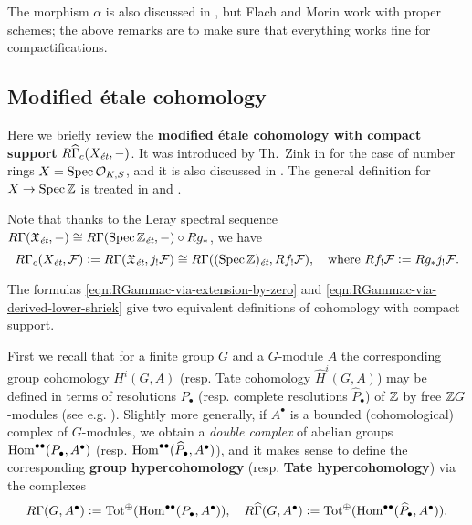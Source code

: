 \documentclass{article}
\numberwithin{equation}{section}
\begin{document}
\begin{appendices}
The morphism $\alpha$ is also discussed in \cite[Appendix~A]{Flach-Morin-2018},
but Flach and Morin work with proper schemes; the above remarks are to make sure
that everything works fine for compactifications.

\subsection*{Modified étale cohomology}

Here we briefly review the
\textbf{modified étale cohomology with compact support}
$R\widehat{\Gamma}_c (X_\et, -)$. It was introduced by Th.~Zink in
\cite[Appendix~2]{Haberland-1978} for the case of number rings
$X = \Spec \mathcal{O}_{K,S}$, and it is also discussed in
\cite[\S II.2]{Milne-ADT}. The general definition for $X \to \Spec\ZZ$
is treated in \cite[\S 6.7]{Flach-Morin-2018} and
\cite[\S 2]{Geisser-Schmidt-2018}.

Note that thanks to the Leray spectral sequence
$R\Gamma (\mathfrak{X}_\et, -) \cong R\Gamma (\Spec \ZZ_\et, -)\circ R g_*$,
we have
\begin{equation}
  \label{eqn:RGammac-via-derived-lower-shriek}
  R\Gamma_c (X_\et, \mathcal{F}) \dfn R\Gamma (\mathfrak{X}_\et, j_!\mathcal{F})
  \cong R\Gamma ((\Spec \ZZ)_\et, R f_! \mathcal{F}), \quad
  \text{where } Rf_! \mathcal{F} \dfn R g_* j_! \mathcal{F}.
\end{equation}

The formulas \eqref{eqn:RGammac-via-extension-by-zero} and
\eqref{eqn:RGammac-via-derived-lower-shriek} give two equivalent definitions of
cohomology with compact support.

First we recall that for a finite group $G$ and a $G$-module $A$ the
corresponding group cohomology $H^i (G,A)$ (resp. Tate cohomology
$\widehat{H}^i (G,A)$) may be defined in terms of resolutions $P_\bullet$
(resp. complete resolutions $\widehat{P}_\bullet$) of $\ZZ$ by free
$\ZZ G$-modules (see e.g. \cite[Chapter~VI]{Brown-1994}). Slightly more
generally, if $A^\bullet$ is a bounded (cohomological) complex of
$G$-modules, we obtain a \emph{double complex} of abelian groups
$\Hom^{\bullet\bullet} (P_\bullet, A^\bullet)$ (resp.  $\Hom^{\bullet\bullet}
(\widehat{P}_\bullet, A^\bullet)$), and it makes sense to define the
corresponding \textbf{group hypercohomology}
(resp. \textbf{Tate hypercohomology}) via the complexes
\[ R\Gamma (G, A^\bullet) \dfn
\Tot^\oplus (\Hom^{\bullet\bullet} (P_\bullet, A^\bullet)), \quad
R\widehat{\Gamma} (G, A^\bullet) \dfn
\Tot^\oplus (\Hom^{\bullet\bullet} (\widehat{P}_\bullet, A^\bullet)). \]


\end{appendices}
\end{document}
